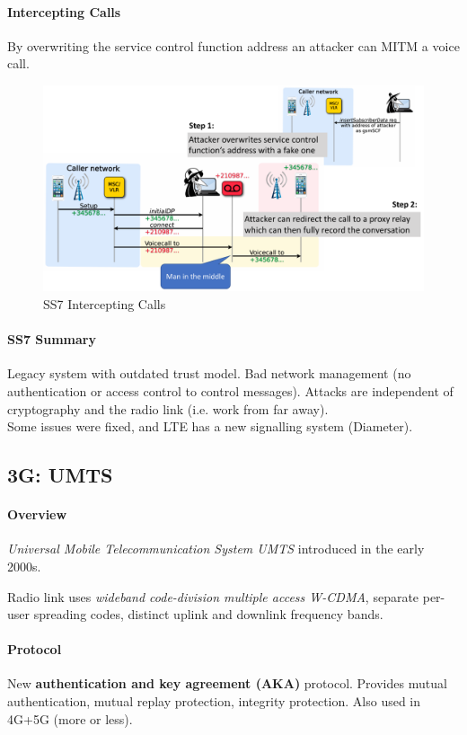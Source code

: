 \paragraph{Intercepting Calls}
By overwriting the service control function address an attacker can MITM a voice call.

\begin{figure}
	\centering
	\includegraphics[scale=0.4]{images/10-ss7-calls.png}
	\caption{SS7 Intercepting Calls}
	\label{fig:ss7-calls}
\end{figure}

\paragraph{SS7 Summary}
Legacy system with outdated trust model.
Bad network management (no authentication or access control to control messages).
Attacks are independent of cryptography and the radio link (i.e. work from far away).
\\
Some issues were fixed, and LTE has a new signalling system (Diameter).


\subsection{3G: UMTS}

\paragraph{Overview}
\textit{Universal Mobile Telecommunication System UMTS} introduced in the early 2000s.

Radio link uses \textit{wideband code-division multiple access W-CDMA}, separate per-user spreading codes, distinct uplink and downlink frequency bands.

\paragraph{Protocol}
New \textbf{authentication and key agreement (AKA)} protocol.
Provides mutual authentication, mutual replay protection, integrity protection.
Also used in 4G+5G (more or less).

